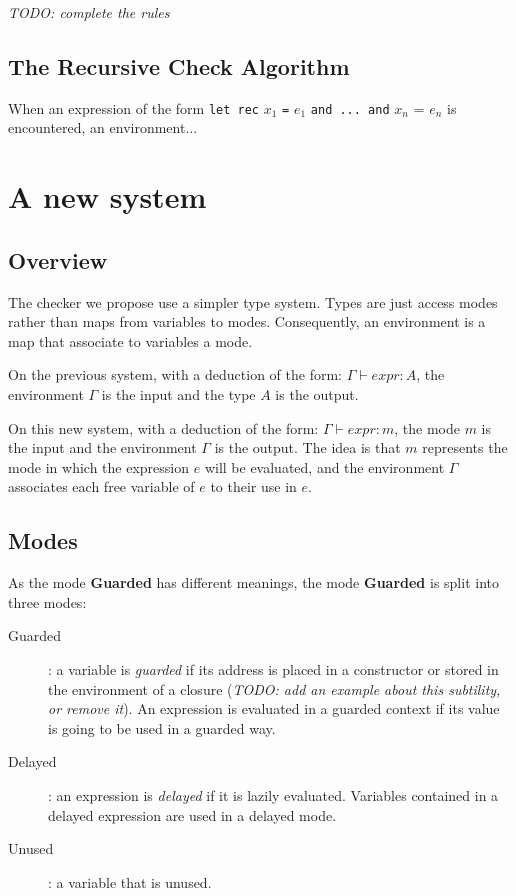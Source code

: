 \documentclass{article}
\begin{document}
\textit{TODO: complete the rules}

\subsection{The Recursive Check Algorithm}

When an expression of the form
\verb"let rec" $x_1$ \verb"=" $e_1$ \verb"and ... and" $x_n$ = $e_n$
is encountered, an environment...

\section{A new system}

\subsection{Overview}
The checker we propose use a simpler type system. Types are just access modes
rather than maps from variables to modes. Consequently, an environment is a map
that associate to variables a mode.

On the previous system, with a deduction of the form: $\Gamma \vdash expr: A$,
the environment $\Gamma$ is the input and the type $A$ is the output.

On this new system, with a deduction of the form: $\Gamma \vdash expr: m$, the
mode $m$ is the input and the environment $\Gamma$ is the output. The idea is
that $m$ represents the mode in which the expression $e$ will be evaluated, and
the environment $\Gamma$ associates each free variable of $e$ to their use in
$e$.

\subsection{Modes}

As the mode \textbf{Guarded} has different meanings, the mode \textbf{Guarded}
is split into three modes:

\begin{description}
  \item[Guarded]: a variable is \textit{guarded} if its address is placed in a
    constructor or stored in the environment of a closure (\textit{TODO: add an
    example about this subtility, or remove it}). An expression is evaluated in     a guarded context if its value is going to be used in a guarded way.
  \item[Delayed]: an expression is \textit{delayed} if it is lazily evaluated.
    Variables contained in a delayed expression are used in a delayed mode.
  \item[Unused]: a variable that is unused.
\end{description}
\end{document}

